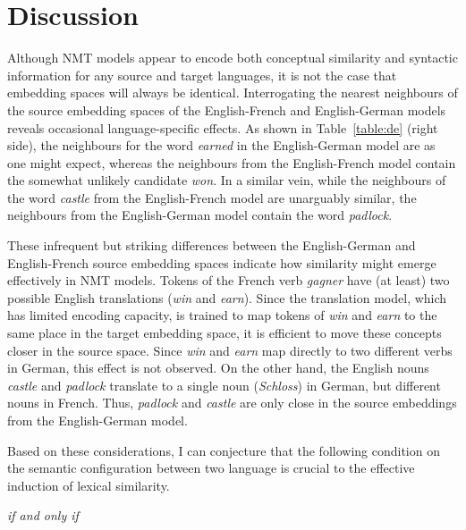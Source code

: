 \section{Discussion}
\label{section:exp}

Although NMT models appear to encode both conceptual similarity and syntactic information for any source and target languages, it is not the case that embedding spaces will always be identical. Interrogating the nearest neighbours of the source embedding spaces of the English-French and English-German models reveals occasional language-specific effects. As shown in Table~\ref{table:de} (right side), the neighbours for the word \emph{earned} in the English-German model are as one might expect, whereas the neighbours from the English-French model contain the somewhat unlikely candidate \emph{won}. In a similar vein, while the neighbours of the word \emph{castle} from the English-French model are unarguably similar, the neighbours from the English-German model contain the word \emph{padlock}.
 
These infrequent but striking differences between the English-German and English-French source embedding spaces indicate how similarity might emerge effectively in NMT models. Tokens of the French verb \emph{gagner} have (at least) two possible English translations (\emph{win} and \emph{earn}). Since the translation model, which has limited encoding capacity, is trained to map tokens of \emph{win} and \emph{earn} to the same place in the target embedding space, it is efficient to move these concepts closer in the source space. Since \emph{win} and \emph{earn} map directly to two different verbs in German, this effect is not observed. On the other hand, the English nouns \emph{castle} and \emph{padlock} translate to a single noun (\emph{Schloss}) in German, but different nouns in French. Thus, \emph{padlock} and \emph{castle} are only close in the source embeddings from the English-German model. 

Based on these considerations, I can conjecture that the following condition on the semantic configuration between two language is crucial to the effective induction of lexical similarity. 


{\centering \emph{if and only if} \\}

